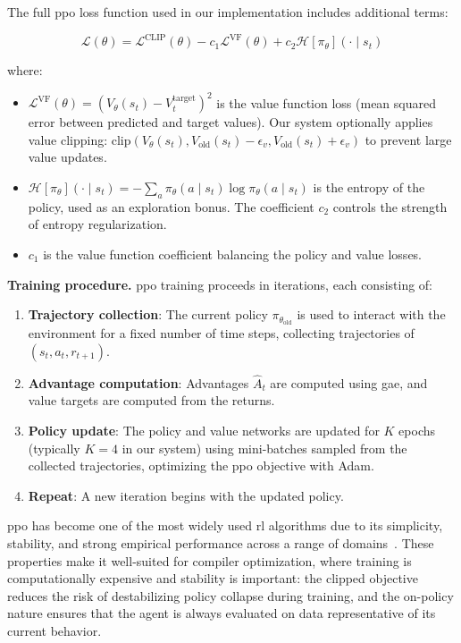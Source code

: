The full \gls{ppo} loss function used in our implementation includes additional terms:

\begin{equation}
    \mathcal{L}(\theta) = \mathcal{L}^{\text{CLIP}}(\theta) - c_1 \mathcal{L}^{\text{VF}}(\theta) + c_2 \mathcal{H}[\pi_\theta](\cdot \mid s_t)
\end{equation}

where:

\begin{itemize}
    \item $\mathcal{L}^{\text{VF}}(\theta) = (V_\theta(s_t) - V_t^{\text{target}})^2$ is the value function loss (mean squared error between predicted and target values). Our system optionally applies value clipping: $\text{clip}(V_\theta(s_t), V_{\text{old}}(s_t) - \epsilon_v, V_{\text{old}}(s_t) + \epsilon_v)$ to prevent large value updates.
    \item $\mathcal{H}[\pi_\theta](\cdot \mid s_t) = -\sum_a \pi_\theta(a \mid s_t) \log \pi_\theta(a \mid s_t)$ is the entropy of the policy, used as an exploration bonus. The coefficient $c_2$ controls the strength of entropy regularization.
    \item $c_1$ is the value function coefficient balancing the policy and value losses.
\end{itemize}

\textbf{Training procedure.} \gls{ppo} training proceeds in iterations, each consisting of:

\begin{enumerate}
    \item \textbf{Trajectory collection}: The current policy $\pi_{\theta_{\text{old}}}$ is used to interact with the environment for a fixed number of time steps, collecting trajectories of $(s_t, a_t, r_{t+1})$.
    \item \textbf{Advantage computation}: Advantages $\hat{A}_t$ are computed using \gls{gae}, and value targets are computed from the returns.
    \item \textbf{Policy update}: The policy and value networks are updated for $K$ epochs (typically $K = 4$ in our system) using mini-batches sampled from the collected trajectories, optimizing the \gls{ppo} objective with Adam.
    \item \textbf{Repeat}: A new iteration begins with the updated policy.
\end{enumerate}

\gls{ppo} has become one of the most widely used \gls{rl} algorithms due to its simplicity, stability, and strong empirical performance across a range of domains~\cite{berner2019dota}. These properties make it well-suited for compiler optimization, where training is computationally expensive and stability is important: the clipped objective reduces the risk of destabilizing policy collapse during training, and the on-policy nature ensures that the agent is always evaluated on data representative of its current behavior.

